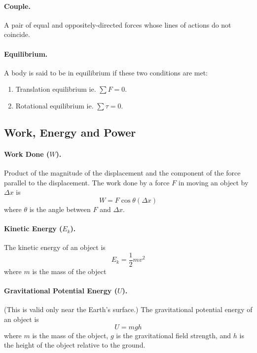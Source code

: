 \documentclass{article}
\begin{document}
\paragraph{Couple.} A pair of equal and oppositely-directed forces whose lines of actions do not coincide.

\paragraph{Equilibrium.} A body is said to be in equilibrium if these two conditions are met:

\begin{enumerate}
\item Translation equilibrium ie. $\sum F = 0$.
\item Rotational equilibrium ie. $\sum \tau = 0$.
\end{enumerate}

\subsection{Work, Energy and Power}

\paragraph{Work Done ($W$).} Product of the magnitude of the displacement and the component of the force parallel to the displacement. The work done by a force $F$ in moving an object by $\Delta x$ is \begin{equation}
W = F\cos\theta(\Delta x)
\end{equation} where $\theta$ is the angle between $F$ and $\Delta x$.

\paragraph{Kinetic Energy ($E_k$).} The kinetic energy of an object is \begin{equation}
E_k = \frac{1}{2}mv^2
\end{equation} where $m$ is the mass of the object

\paragraph{Gravitational Potential Energy ($U$).} (This is valid only near the Earth's surface.) The gravitational potential energy of an object is \begin{equation}
U = mgh
\end{equation} where $m$ is the mass of the object, $g$ is the gravitational field strength, and $h$ is the height of the object relative to the ground.
\end{document}
